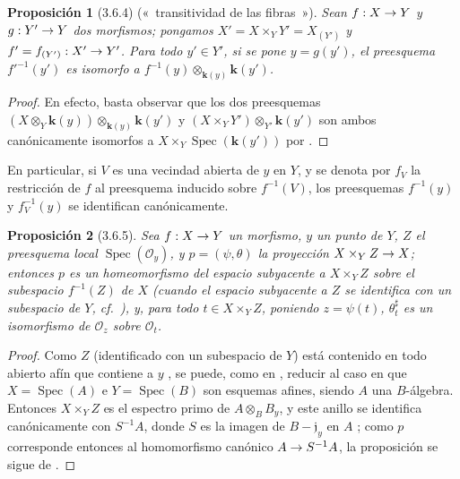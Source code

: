 \documentclass[oneside]{amsart}
\theoremstyle{ega-env-style}
\theoremstyle{ega-thm-env-style}
\newtheorem*{proposition}{Proposición}
\theoremstyle{ega-defn-env-style}
\def\mathcal{\mathscr}
\def\setmin{-}                      %
\renewcommand{\to}{\mathchoice{\longrightarrow}{\rightarrow}{\rightarrow}{\rightarrow}}
\let\EGAOriginalLabel\label
\renewcommand{\label}[1]{\phantomsection\EGAOriginalLabel{#1}}
\begin{document}
\begin{proposition}[3.6.4) \mdseries\upshape («~transitividad de las fibras~»]
\label{I.3.6.4}
%
Sean $f:X\to Y$ y $g:Y'\to Y$ dos morfismos; pongamos $X'=X\times_Y Y'=X_{(Y')}$ y $f'=f_{(Y')}:X'\to Y'$.
Para todo $y'\in Y'$, si se pone $y=g(y')$, el preesquema $f'^{-1}(y')$ es isomorfo a $f^{-1}(y)\otimes_{\boldsymbol{k}(y)}\boldsymbol{k}(y')$.
\end{proposition}

\begin{proof}
En efecto, basta observar que los dos preesquemas $(X\otimes_Y\boldsymbol{k}(y))\otimes_{\boldsymbol{k}(y)}\boldsymbol{k}(y')$ y $(X\times_Y Y')\otimes_{Y'}\boldsymbol{k}(y')$ son ambos canónicamente isomorfos a $X\times_Y\operatorname{Spec}(\boldsymbol{k}(y'))$ por .
\end{proof}

En particular, si $V$ es una vecindad abierta de $y$ en $Y$, y se denota por $f_V$ la restricción de $f$ al preesquema inducido sobre $f^{-1}(V)$, los preesquemas $f^{-1}(y)$ y $f_V^{-1}(y)$ se identifican canónicamente.

\par\medskip
\begin{proposition}[3.6.5]
\label{I.3.6.5}
Sea $f:X\to Y$ un morfismo, $y$ un punto de $Y$, $Z$ el preesquema local $\operatorname{Spec}(\mathcal{O}_y)$, y $p=(\psi,\theta)$ la proyección $X\times_Y Z\to X$; entonces $p$ es un homeomorfismo del espacio subyacente a $X\times_Y Z$ sobre el subespacio $f^{-1}(Z)$ de $X$ \textup{(cuando el espacio subyacente a $Z$ se identifica con un subespacio de $Y$, cf.~)}, y, para todo $t\in X\times_Y Z$, poniendo $z=\psi(t)$, $\theta_t^\sharp$ es un isomorfismo de $\mathcal{O}_z$ sobre $\mathcal{O}_t$.
\end{proposition}

\begin{proof}
Como $Z$ (identificado con un subespacio de $Y$) está contenido en todo abierto afín que contiene a $y$ , se puede, como en , reducir al caso en que $X=\operatorname{Spec}(A)$ e $Y=\operatorname{Spec}(B)$ son esquemas afines, siendo $A$ una $B$-álgebra.
Entonces $X\times_Y Z$ es el espectro primo de $A\otimes_B B_y$, y este anillo se identifica canónicamente con $S^{-1}A$, donde $S$ es la imagen de $B\setmin\mathfrak{j}_y$ en $A$ ; como $p$ corresponde entonces al homomorfismo canónico $A\to S^{-1}A$, la proposición se sigue de .
\end{proof}
\end{document}
